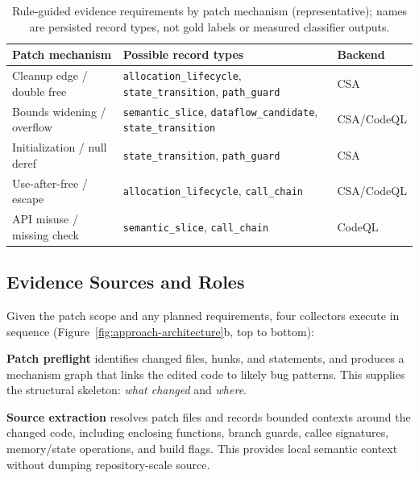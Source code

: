 \begin{table}[t]
\footnotesize
\centering
\setlength{\tabcolsep}{3pt}
\caption{Rule-guided evidence requirements by patch mechanism (representative); names are persisted record types, not gold labels or measured classifier outputs.}
\label{tab:evidence-routing}
\begin{tabular}{@{}p{}p{}p{}@{}}
\toprule
\textbf{Patch mechanism} & \textbf{Possible record types} & \textbf{Backend} \\
\midrule
Cleanup edge / double free & \texttt{allocation\_lifecycle}, \texttt{state\_transition}, \texttt{path\_guard} & CSA \\
Bounds widening / overflow & \texttt{semantic\_slice}, \texttt{dataflow\_candidate}, \texttt{state\_transition} & CSA/CodeQL \\
Initialization / null deref & \texttt{state\_transition}, \texttt{path\_guard} & CSA \\
Use-after-free / escape & \texttt{allocation\_lifecycle}, \texttt{call\_chain} & CSA/CodeQL \\
API misuse / missing check & \texttt{semantic\_slice}, \texttt{call\_chain} & CodeQL \\
\bottomrule
\end{tabular}
\end{table}

\subsection{Evidence Sources and Roles}
\label{sec:evidence-roles}

Given the patch scope and any planned requirements, four collectors execute in sequence (Figure~\ref{fig:approach-architecture}b, top to bottom):

\textbf{Patch preflight} identifies changed files, hunks, and statements, and produces a mechanism graph that links the edited code to likely bug patterns.  This supplies the structural skeleton: \emph{what changed} and \emph{where}.

\textbf{Source extraction} resolves patch files and records bounded contexts around the changed code, including enclosing functions, branch guards, callee signatures, memory/state operations, and build flags.  This provides local semantic context without dumping repository-scale source.

